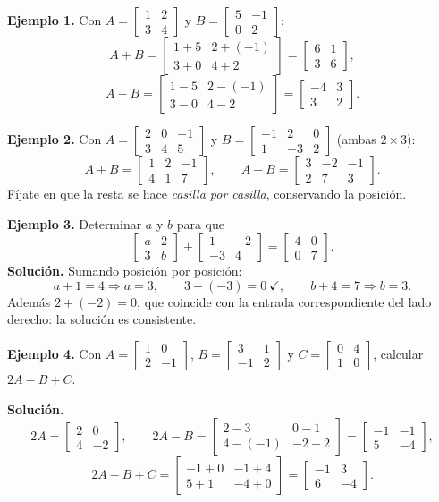 \documentclass[12pt, letterpaper]{article}
\newcommand{\mwmat}[1]{\ensuremath{\begin{bmatrix}#1\end{bmatrix}}}
\begin{document}
\begin{cuadrosolucion}
  \small
  \textbf{Ejemplo 1.} Con $A=\mwmat{1&2\\3&4}$ y $B=\mwmat{5&-1\\0&2}$:
  \[
    A+B=\mwmat{1+5 & 2+(-1)\\ 3+0 & 4+2}=\mwmat{6&1\\3&6},
  \]
  \[
    A-B=\mwmat{1-5 & 2-(-1)\\ 3-0 & 4-2}=\mwmat{-4&3\\3&2}.
  \]
\end{cuadrosolucion}

\begin{cuadrosolucion}
  \small
  \textbf{Ejemplo 2.} Con
  $A=\mwmat{2&0&-1\\3&4&5}$ y $B=\mwmat{-1&2&0\\1&-3&2}$ (ambas $2\times3$):
  \[
    A+B=\mwmat{1&2&-1\\4&1&7},
    \qquad
    A-B=\mwmat{3&-2&-1\\2&7&3}.
  \]
  Fíjate en que la resta se hace \emph{casilla por casilla}, conservando la
  posición.
\end{cuadrosolucion}

\begin{cuadrosolucion}
  \small
  \textbf{Ejemplo 3.} Determinar $a$ y $b$ para que
  \[
    \mwmat{a&2\\3&b}+\mwmat{1&-2\\-3&4}=\mwmat{4&0\\0&7}.
  \]
  \textbf{Solución.} Sumando posición por posición:
  \[
    a+1=4\Rightarrow a=3,\qquad 3+(-3)=0\ \checkmark,\qquad b+4=7\Rightarrow b=3.
  \]
  Además $2+(-2)=0$, que coincide con la entrada correspondiente del lado
  derecho: la solución es consistente.
\end{cuadrosolucion}

\begin{cuadrosolucion}
  \small
  \textbf{Ejemplo 4.} Con $A=\mwmat{1&0\\2&-1}$,
  $B=\mwmat{3&1\\-1&2}$ y $C=\mwmat{0&4\\1&0}$, calcular $2A-B+C$.

  \medskip
  \textbf{Solución.}
  \[
    2A=\mwmat{2&0\\4&-2},\qquad
    2A-B=\mwmat{2-3 & 0-1\\ 4-(-1) & -2-2}=\mwmat{-1&-1\\5&-4},
  \]
  \[
    2A-B+C=\mwmat{-1+0 & -1+4\\ 5+1 & -4+0}=\mwmat{-1&3\\6&-4}.
  \]
\end{cuadrosolucion}
\end{document}
